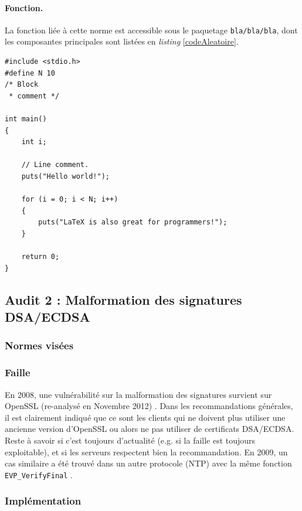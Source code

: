 			\paragraph{Fonction.\\}
			La fonction liée à cette norme est accessible sous le paquetage
			\texttt{bla/bla/bla}, dont les composantes principales sont 
			listées en \textit{listing} \ref{codeAleatoire}.
		
		
		\begin{lstlisting}[style=customc,caption=codeAleatoire.c, label=codeAleatoire]
#include <stdio.h>
#define N 10
/* Block
 * comment */
 
int main()
{
    int i;
 
    // Line comment.
    puts("Hello world!");
 
    for (i = 0; i < N; i++)
    {
        puts("LaTeX is also great for programmers!");
    }
 
    return 0;
}
		\end{lstlisting}
		
\subsection{Audit 2 : Malformation des signatures DSA/ECDSA}
		\subsubsection{Normes visées}
	
		
		\subsubsection{Faille}
		
			
		En 2008, une vulnérabilité sur la malformation des signatures 
		survient sur OpenSSL (re-analysé en Novembre 2012)
		\cite{openssl2009secadv} \cite{cve-2008-5077}. Dans les recommandations générales, il est clairement indiqué que ce sont 
		les clients qui ne doivent plus utiliser une ancienne version d'OpenSSL
		ou alors ne pas utiliser de certificats DSA/ECDSA. 	Reste à savoir si c'est toujours d'actualité (e.g. si la faille est
		toujours exploitable), et si les serveurs respectent bien la
		recommandation. 	En 2009, un cas similaire a été trouvé dans un autre protocole 
		(NTP) avec la même fonction \texttt{EVP\_VerifyFinal} \cite{cve-2009-0021}.
		
		\subsubsection{Implémentation}
			
